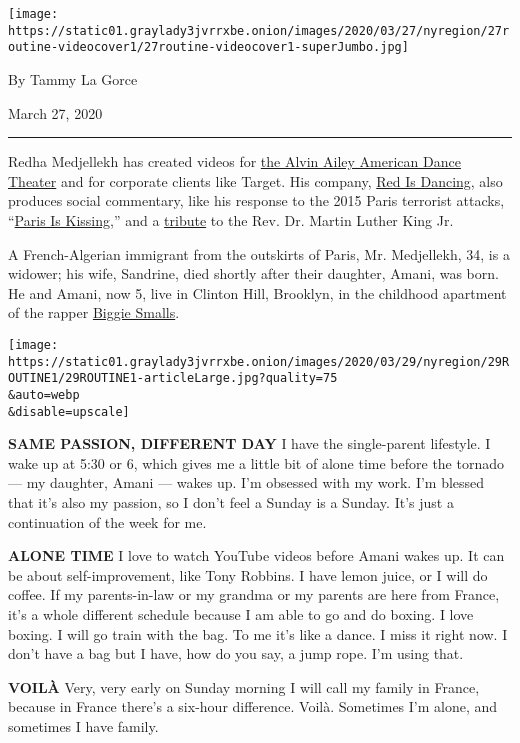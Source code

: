 \texttt{[image: https://static01.graylady3jvrrxbe.onion/images/2020/03/27/nyregion/27routine-videocover1/27routine-videocover1-superJumbo.jpg]}

By Tammy La Gorce

March 27, 2020

\begin{center}\rule{0.5\linewidth}{\linethickness}\end{center}

Redha Medjellekh has created videos for
\href{https://www.alvinailey.org/}{the Alvin Ailey American Dance
Theater} and for corporate clients like Target. His company,
\href{http://www.redisdancing.com/}{Red Is Dancing}, also produces
social commentary, like his response to the 2015 Paris terrorist
attacks, ``\href{https://www.youtube.com/watch?v=4Ebjg-m9eLk}{Paris Is
Kissing},'' and a
\href{https://www.instagram.com/p/B1tuy2THJjd/}{tribute} to the Rev. Dr.
Martin Luther King Jr.

A French-Algerian immigrant from the outskirts of Paris, Mr. Medjellekh,
34, is a widower; his wife, Sandrine, died shortly after their daughter,
Amani, was born. He and Amani, now 5, live in Clinton Hill, Brooklyn, in
the childhood apartment of the rapper
\href{https://www.nytimes3xbfgragh.onion/1997/03/10/us/rapper-is-shot-to-death-in-echo-of-killing-6-months-ago.html}{Biggie
Smalls}.

\texttt{[image: https://static01.graylady3jvrrxbe.onion/images/2020/03/29/nyregion/29ROUTINE1/29ROUTINE1-articleLarge.jpg?quality=75\\\&auto=webp\\\&disable=upscale]}

\textbf{SAME PASSION, DIFFERENT DAY} I have the single-parent lifestyle.
I wake up at 5:30 or 6, which gives me a little bit of alone time before
the tornado --- my daughter, Amani --- wakes up. I'm obsessed with my
work. I'm blessed that it's also my passion, so I don't feel a Sunday is
a Sunday. It's just a continuation of the week for me.

\textbf{ALONE TIME} I love to watch YouTube videos before Amani wakes
up. It can be about self-improvement, like Tony Robbins. I have lemon
juice, or I will do coffee. If my parents-in-law or my grandma or my
parents are here from France, it's a whole different schedule because I
am able to go and do boxing. I love boxing. I will go train with the
bag. To me it's like a dance. I miss it right now. I don't have a bag
but I have, how do you say, a jump rope. I'm using that.

\textbf{VOILÀ} Very, very early on Sunday morning I will call my family
in France, because in France there's a six-hour difference. Voilà.
Sometimes I'm alone, and sometimes I have family.

